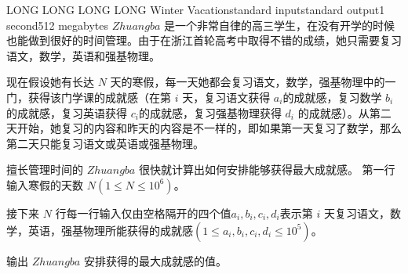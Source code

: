 \begin{problem}{LONG LONG LONG LONG Winter Vacation}{standard input}{standard output}{1 second}{512 megabytes}
$Zhuangba$ 是一个非常自律的高三学生，在没有开学的时候也能做到很好的时间管理。由于在浙江首轮高考中取得不错的成绩，她只需要复习语文，数学，英语和强基物理。
    
现在假设她有长达 $N$ 天的寒假，每一天她都会复习语文，数学，强基物理中的一门，获得该门学课的成就感（在第 $i$ 天，复习语文获得 $a_i$的成就感，复习数学 $b_i$的成就感，复习英语获得 $c_i$的成就感，复习强基物理获得 $d_i$ 的成就感）。从第二天开始，她复习的内容和昨天的内容是不一样的，即如果第一天复习了数学，那么第二天只能复习语文或英语或强基物理。
    
擅长管理时间的 $Zhuangba$ 很快就计算出如何安排能够获得最大成就感。
\InputFile
第一行输入寒假的天数 $N(1\le N\le 10^6)$。

接下来 $N$ 行每一行输入仅由空格隔开的四个值$a_i,b_i,c_i,d_i$表示第 $i$ 天复习语文，数学，英语，强基物理所能获得的成就感$(1\le a_i,b_i,c_i,d_i\le 10^5)$。

\OutputFile

输出 $Zhuangba$ 安排获得的最大成就感的值。

\Example

\begin{example}
%
\end{example}

\end{problem}
